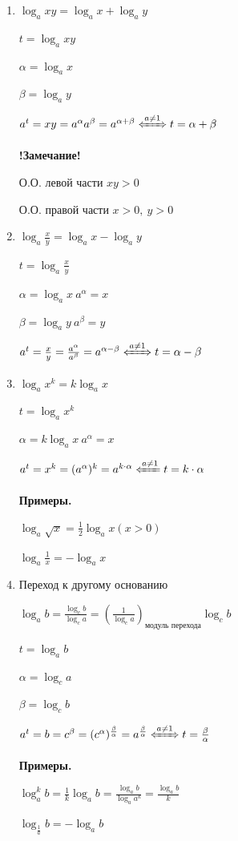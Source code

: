 \documentclass{article}
\begin{document}
    \begin{enumerate}
        \item \(\log_a xy = \log_a x + \log_a y\)

        \( t = \log_a xy \)
        
        \( \alpha = \log_a x \)

        \( \beta = \log_a y \)
        
        \(a^t = xy = a^{\alpha}a^{\beta} = a^{\alpha+\beta} \xLeftrightarrow[]{a \neq 1} t = \alpha + \beta\)

        \textbf{!Замечание!}
        
        О.О. левой части \(xy > 0\)

        О.О. правой части \(x > 0,\ y > 0\)

        \item \( \log_a \frac{x}{y} = \log_a x - \log_a y \)
        
        \( t = \log_a \frac{x}{y} \)
        
        \( \alpha = \log_a x\ a^{\alpha} = x \)

        \( \beta = \log_a y\ a^{\beta} = y \)

        \( a^t = \frac{x}{y} = \frac{a^{\alpha}}{a^{\beta}} = a^{\alpha - \beta} \xLeftrightarrow[]{a \neq 1} t = \alpha - \beta \)
        
        \item \(\log_a x^k = k\log_a x\)
        
        \( t = \log_a x^k \)

        \( \alpha = k\log_a x\ a^{\alpha} = x \)
        
        \(a^t = x^k = (a^\alpha)^k = a^{k \cdot \alpha} \xLeftarrow[]{a \neq 1} t = k \cdot \alpha\)

        \textbf{Примеры.}

        \( \log_a \sqrt{x} = \frac{1}{2}\log_a x (x > 0)\)

        \( \log_a \frac{1}{x} = -\log_a x \)
        
        \item Переход к другому основанию

        \(\log_a b = \frac{\log_c b}{\log_c a} = (\frac{1}{\log_c a})_{\textrm{модуль перехода}}\log_c b\)
    
        \( t = \log_a b \)

        \( \alpha = \log_c a \)
        
        \( \beta = \log_c b \) 
        
        \(a^t = b = c^\beta = (c^\alpha)^\frac{\beta}{\alpha} = a^\frac{\beta}{\alpha} \xLeftrightarrow[]{a \neq 1} t = \frac{\beta}{\alpha} \)
    
        \textbf{Примеры.}
        
        \( \log_a^k b = \frac{1}{k}\log_a b = \frac{\log_a b}{\log_a a^k} = \frac{\log_a b}{k}\)

        \( \log_\frac{1}{a} b = -\log_a b \)
    \end{enumerate}
\end{document}
